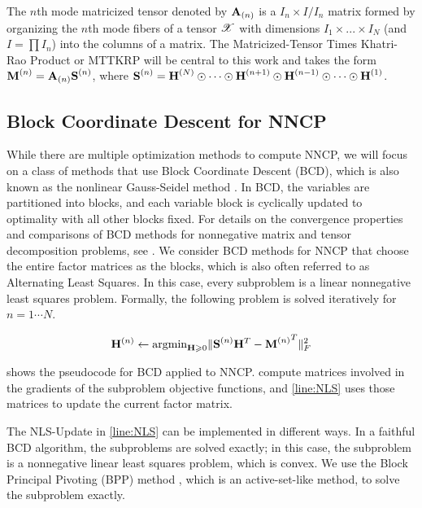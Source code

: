The $n$th mode matricized tensor denoted by $\M{A}_{(n)}$ is a $I_n\times I/I_n$ matrix formed by organizing the $n$th mode fibers of a tensor $\T{X}$ with dimensions $I_{1} \times ... \times I_{N}$ (and $I=\prod I_n$) into the columns of a matrix. 
The Matricized-Tensor Times Khatri-Rao Product or MTTKRP will be central to this work and takes the form $\Mn{M}{n} = \Mz{A}{n} \Mn{S}{n}$, where $\Mn{S}{n}= \Mn{H}{N} \Khat \cdots \Khat \Mn{H}{n+1} \Khat \Mn{H}{n-1} \Khat  \cdots \Khat \Mn{H}{1}$. 

\subsection {Block Coordinate Descent for NNCP}

While there are multiple optimization methods to compute NNCP, we will focus on a class of methods that use Block Coordinate Descent (BCD), which is also known as the nonlinear Gauss-Seidel method \cite{Bertsekas1999}.
In BCD, the variables are partitioned into blocks, and each variable block is cyclically updated to optimality with all other blocks fixed.
For details on the convergence properties and comparisons of BCD methods for nonnegative matrix and tensor decomposition problems, see \cite{KHP2014}.
We consider BCD methods for NNCP that choose the entire factor matrices as the blocks, which is also often referred to as Alternating Least Squares.
In this case, every subproblem is a linear nonnegative least squares problem. Formally, the following problem 
is solved iteratively for $n = 1 \cdots N$.

$$\HH^{(n)} \leftarrow \argmin_{\HH \geq 0}  \| \Mn{S}{n} \HH^T - {\Mn{M}{n}}^T \|_F^2$$


 shows the pseudocode for BCD applied to NNCP.
 compute matrices involved in the gradients of the subproblem objective functions, and \cref{line:NLS} uses those matrices to update the current factor matrix.

The NLS-Update in \cref{line:NLS} can be implemented in different ways.
In a faithful BCD algorithm, the subproblems are solved exactly; in this case, the subproblem is a nonnegative linear least squares problem, which is convex.
We use the Block Principal Pivoting (BPP) method \cite{KP2011,KHP2014}, which is an active-set-like method, to solve the subproblem exactly.

